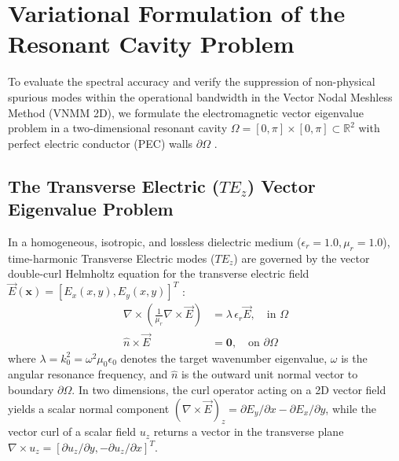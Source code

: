 \documentclass[preprint,12pt]{elsarticle}
\begin{document}
\section{Variational Formulation of the Resonant Cavity Problem}
\label{sec:variational_formulation}

To evaluate the spectral accuracy and verify the suppression of non-physical spurious modes within the operational bandwidth in the Vector Nodal Meshless Method (VNMM 2D), we formulate the electromagnetic vector eigenvalue problem in a two-dimensional resonant cavity $\Omega = [0, \pi] \times [0, \pi] \subset \mathbb{R}^2$ with perfect electric conductor (PEC) walls $\partial\Omega$ \cite{harrington2001time}.

\subsection{The Transverse Electric (\texorpdfstring{$TE_z$}{TEz}) Vector Eigenvalue Problem}
\label{subsec:strong_form}

In a homogeneous, isotropic, and lossless dielectric medium ($\epsilon_r = 1.0, \mu_r = 1.0$), time-harmonic Transverse Electric modes ($TE_z$) are governed by the vector double-curl Helmholtz equation for the transverse electric field $\vec{E}(\mathbf{x}) = [E_x(x,y), E_y(x,y)]^T$ \cite{monk2003finite, ortiz2023tese}:
\begin{align}
    \nabla \times \left( \frac{1}{\mu_r} \nabla \times \vec{E} \right) & = \lambda \, \epsilon_r \vec{E}, \quad \text{in } \Omega \label{eq:helmholtz_strong} \\
    \hat{n} \times \vec{E}                                             & = \mathbf{0}, \quad \text{on } \partial\Omega \label{eq:pec_boundary}
\end{align}
where $\lambda = k_0^2 = \omega^2 \mu_0 \epsilon_0$ denotes the target wavenumber eigenvalue, $\omega$ is the angular resonance frequency, and $\hat{n}$ is the outward unit normal vector to boundary $\partial\Omega$. In two dimensions, the curl operator acting on a 2D vector field yields a scalar normal component $(\nabla \times \vec{E})_z = \partial E_y/\partial x - \partial E_x/\partial y$, while the vector curl of a scalar field $u_z$ returns a vector in the transverse plane $\nabla \times u_z = [\partial u_z/\partial y, -\partial u_z/\partial x]^T$.
\end{document}
